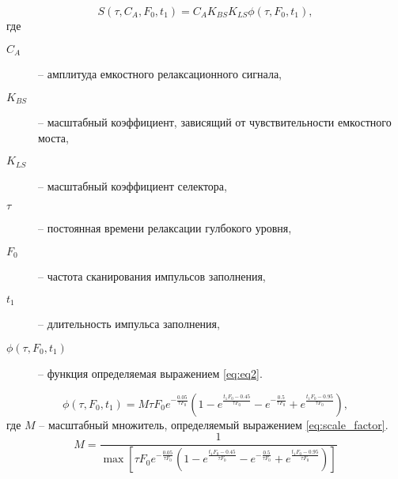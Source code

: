     \begin{equation}
        \label{eq:eq1}
        S\left(\tau,C_A,F_0, t_1\right) = C_A K_{BS} K_{LS} \phi\left(\tau,F_0,t_1\right),
    \end{equation}
    где
    \begin{description}
        \item[$C_A$] -- амплитуда емкостного релаксационного сигнала,
        \item[$K_{BS}$] -- масштабный коэффициент, зависящий от чувствительности 
        емкостного моста,
        \item[$K_{LS}$] -- масштабный коэффициент селектора,
        \item[$\tau$] -- постоянная времени релаксации гулбокого уровня,
        \item[$F_0$] -- частота сканирования импульсов заполнения,
        \item[$t_1$] -- длительность импульса заполнения,
        \item[$\phi\left(\tau,F_0,t_1\right)$] -- функция определяемая выражением
        \ref{eq:eq2}.
    \end{description}
    \begin{equation}
        \label{eq:eq2}
        \phi\left(\tau,F_0,t_1\right) = 
        M \tau F_0 e^{-\frac{0.05}{\tau F_0}}
        \left(1-e^{\frac{t_1 F_0-0.45}{\tau F_0}}
        -e^{-\frac{0.5}{\tau F_0}}+
        e^{\frac{t_1 F_0-0.95}{\tau F_0}}\right),
    \end{equation}
    где $M$ -- масштабный множитель, определяемый выражением \ref{eq:scale_factor}.
    \begin{equation}
        \label{eq:scale_factor}
        M = \frac{1}{\max{\left[
        \tau F_0 e^{-\frac{0.05}{\tau F_0}}
        \left(1-e^{\frac{t_1 F_0-0.45}{\tau F_0}}
        -e^{-\frac{0.5}{\tau F_0}}+
        e^{\frac{t_1 F_0-0.95}{\tau F_0}}\right)
        \right]}}
    \end{equation}